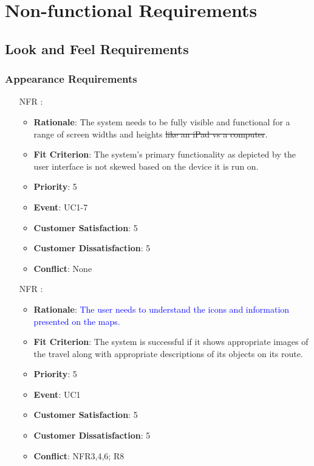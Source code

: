 \documentclass[12pt, titlepage]{article}
\newcounter{reqnum} %
\newcounter{freqnum} %
\begin{document}
\section{Non-functional Requirements}

\subsection{Look and Feel Requirements}


\subsubsection{Appearance Requirements}
\begin{itemize}
\item[NFR\refstepcounter{freqnum}\thefreqnum
\label{NFR}:] 
\begin{itemize}
    \item \textbf{Rationale}: The system needs to be fully visible and functional for a range of screen widths and heights\sout{ like an iPad vs a computer}.
    \item \textbf{Fit Criterion}: The system's primary functionality as depicted by the user interface is not skewed based on the device it is run on.
    \item \textbf{Priority}: 5
    \item \textbf{Event}: UC1-7 %
    \item \textbf{Customer Satisfaction}: 5
    \item \textbf{Customer Dissatisfaction}: 5
    \item \textbf{Conflict}: None
\end{itemize}
\item[NFR\refstepcounter{freqnum}\thefreqnum
\label{NFR}:] 
\begin{itemize}
    \item \textbf{Rationale}: \textcolor{blue}{The user needs to understand the icons and information presented on the maps.}
    \item \textbf{Fit Criterion}: The system is successful if it shows appropriate images of the travel along with appropriate descriptions of its objects on its route.
    \item \textbf{Priority}: 5
    \item \textbf{Event}: UC1 %
    \item \textbf{Customer Satisfaction}: 5
    \item \textbf{Customer Dissatisfaction}: 5
    \item \textbf{Conflict}: NFR3,4,6; R8
\end{itemize}


\end{itemize}
\end{document}
